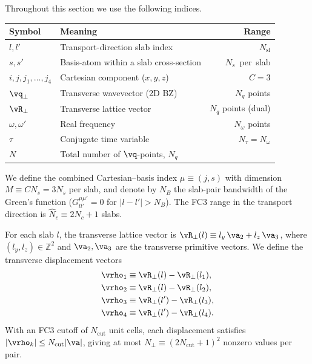 Throughout this section we use the following indices.
\begin{center}
\begin{tabular}{llr}
  \toprule
  Symbol & Meaning & Range \\
  \midrule
  $l,l'$               & Transport-direction slab index              & $N_\mathrm{sl}$ \\
  $s,s'$               & Basis-atom within a slab cross-section      & $N_s$~per~slab \\
  $i,j,j_1,\ldots,j_4$ & Cartesian component ($x,y,z$)               & $C=3$ \\
  $\vq_\perp$          & Transverse wavevector (2D BZ)                & $N_q$ points \\
  $\vR_\perp$          & Transverse lattice vector                    & $N_q$ points (dual) \\
  $\omega,\omega'$     & Real frequency                               & $N_\omega$ points \\
  $\tau$               & Conjugate time variable                      & $N_\tau = N_\omega$ \\
  $N$                  & Total number of $\vq$-points, $N_q$         & \\
  \bottomrule
\end{tabular}
\end{center}

\noindent
We define the combined Cartesian--basis index $\mu \equiv (j,s)$
with dimension $M \equiv CN_s = 3N_s$ per slab, and denote by $N_B$
the slab-pair bandwidth of the Green's function
($G^{\mu\mu'}_{ll'} = 0$ for $|l-l'|>N_B$).  The FC3 range in the
transport direction is $\hat{N}_c \equiv 2N_c+1$ slabs.

For each slab $l$, the transverse lattice vector is
$\vR_\perp(l) \equiv l_y\,\va_2 + l_z\,\va_3$,
where $(l_y, l_z)\in\mathbb{Z}^2$ and $\va_2, \va_3$ are the
transverse primitive vectors.  We define the transverse displacement
vectors
\begin{align}
  \vrho_1 &\equiv \vR_\perp(l)  - \vR_\perp(l_1), \label{eq:rho1}\\
  \vrho_2 &\equiv \vR_\perp(l)  - \vR_\perp(l_2), \label{eq:rho2}\\
  \vrho_3 &\equiv \vR_\perp(l') - \vR_\perp(l_3), \label{eq:rho3}\\
  \vrho_4 &\equiv \vR_\perp(l') - \vR_\perp(l_4). \label{eq:rho4}
\end{align}
With an FC3 cutoff of $N_\mathrm{cut}$ unit cells, each
displacement satisfies $|\vrho_k|\le N_\mathrm{cut}|\va|$, giving
at most $N_\perp \equiv (2N_\mathrm{cut}+1)^2$ nonzero values per
pair.

